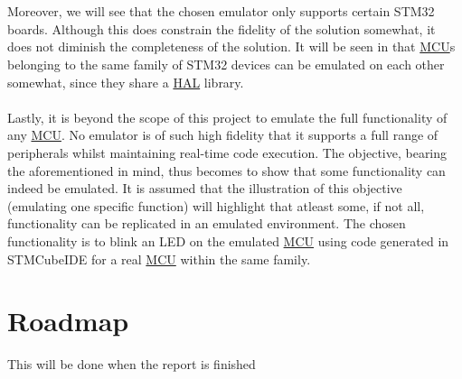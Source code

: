 \\\\
Moreover, we will see that the chosen emulator only supports certain STM32 boards. Although this does constrain the fidelity of the solution somewhat, it does not diminish the completeness of the solution. It will be seen in \textbf{} that \hyperref[listAbr]{MCU}s belonging to the same family of STM32 devices can be emulated on each other somewhat, since they share a \hyperref[listAbr]{HAL} library.
\\\\
Lastly, it is beyond the scope of this project to emulate the full functionality of any \hyperref[listAbr]{MCU}. No emulator is of such high fidelity that it supports a full range of peripherals whilst maintaining real-time code execution. The objective, bearing the aforementioned in mind, thus becomes to show that some functionality can indeed be emulated. It is assumed that the illustration of this objective (emulating one specific function) will highlight that atleast some, if not all, functionality can be replicated in an emulated environment. The chosen functionality is to blink an LED on the emulated \hyperref[listAbr]{MCU} using code generated in STMCubeIDE for a real \hyperref[listAbr]{MCU} within the same family. 

\section{Roadmap}
\label{rdmap}

\color{green} This will be done when the report is finished\color{black}

